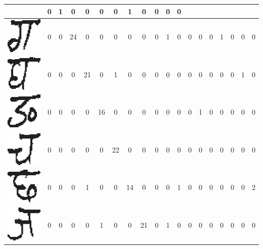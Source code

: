 \begin{table}[h]
\begin{tabular}{|c|c|c|c|c|c|c|c|c|c|c|c|c|c|c|c|c|c|c|}
 & 0 & 1 & 0 & 0 & 0 & 0 & 1 & 0 & 0 & 0 & 0\tabularnewline
\hline
\includegraphics[scale=0.25]{figures/datasets/nhcr/consonants/3ga} & 0 & 0 & 24 & 0 & 0 & 0 & 0 & 0 & 0 & 1 & 0 & 0 & 0 & 0 & 1 & 0 & 0 & 0\tabularnewline
\hline
\includegraphics[scale=0.25]{figures/datasets/nhcr/consonants/4gha} & 0 & 0 & 0 & 21 & 0 & 1 & 0 & 0 & 0 & 0 & 0 & 0 & 0 & 0 & 0 & 0 & 1 & 0\tabularnewline
\hline
\includegraphics[scale=0.25]{figures/datasets/nhcr/consonants/5na} & 0 & 0 & 0 & 0 & 16 & 0 & 0 & 0 & 0 & 0 & 0 & 0 & 1 & 0 & 0 & 0 & 0 & 0\tabularnewline
\hline
\includegraphics[scale=0.25]{figures/datasets/nhcr/consonants/6cha} & 0 & 0 & 0 & 0 & 0 & 22 & 0 & 0 & 0 & 0 & 0 & 0 & 0 & 0 & 0 & 0 & 0 & 0\tabularnewline
\hline
\includegraphics[scale=0.25]{figures/datasets/nhcr/consonants/7chha} & 0 & 0 & 0 & 1 & 0 & 0 & 14 & 0 & 0 & 0 & 1 & 0 & 0 & 0 & 0 & 0 & 0 & 2\tabularnewline
\hline
\includegraphics[scale=0.25]{figures/datasets/nhcr/consonants/8ja} & 0 & 0 & 0 & 0 & 1 & 0 & 0 & 21 & 0 & 1 & 0 & 0 & 0 & 0 & 0 & 0 & 0 & 0\tabularnewline

\end{tabular}
\end{table}
